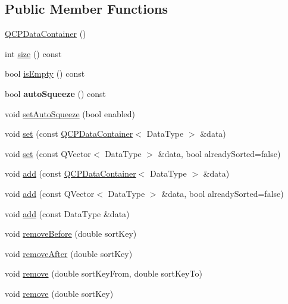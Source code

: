 \subsection*{Public Member Functions}
\begin{DoxyCompactItemize}
\item 
\hyperlink{classQCPDataContainer_af86c0c63719f92c360ff67cc06c6fe6f}{Q\+C\+P\+Data\+Container} ()
\item 
int \hyperlink{classQCPDataContainer_a8e9b262c739672e13472d0d45b720258}{size} () const
\item 
bool \hyperlink{classQCPDataContainer_a7bdebfccd2f9f84bf032882f9d6b00a8}{is\+Empty} () const
\item 
\mbox{\label{classQCPDataContainer_a64f0f1621ca46de2352eaf87476db9b1}} 
bool {\bfseries auto\+Squeeze} () const
\item 
void \hyperlink{classQCPDataContainer_a233f866760a78950d2a393c1a4bc54b5}{set\+Auto\+Squeeze} (bool enabled)
\item 
void \hyperlink{classQCPDataContainer_ae7042bd534fc3ce7befa2ce3f790b5bf}{set} (const \hyperlink{classQCPDataContainer}{Q\+C\+P\+Data\+Container}$<$ Data\+Type $>$ \&data)
\item 
void \hyperlink{classQCPDataContainer_aff99fffbb26597a354c4bc8312596ab2}{set} (const Q\+Vector$<$ Data\+Type $>$ \&data, bool already\+Sorted=false)
\item 
void \hyperlink{classQCPDataContainer_a42b98bd994307ccd163a43d576f91ad9}{add} (const \hyperlink{classQCPDataContainer}{Q\+C\+P\+Data\+Container}$<$ Data\+Type $>$ \&data)
\item 
void \hyperlink{classQCPDataContainer_a51d2a4c9ce4baf5e950b767d26673972}{add} (const Q\+Vector$<$ Data\+Type $>$ \&data, bool already\+Sorted=false)
\item 
void \hyperlink{classQCPDataContainer_a715e8e9972466804954a2f8fbd5288b7}{add} (const Data\+Type \&data)
\item 
void \hyperlink{classQCPDataContainer_aa7f74cbce304b0369e1626c3798e1eda}{remove\+Before} (double sort\+Key)
\item 
void \hyperlink{classQCPDataContainer_abbe5d87ffc10b5aeffa5bb42cf03aa3c}{remove\+After} (double sort\+Key)
\item 
void \hyperlink{classQCPDataContainer_ae5f569a120648b167efa78835f12fd38}{remove} (double sort\+Key\+From, double sort\+Key\+To)
\item 
void \hyperlink{classQCPDataContainer_a2dbded7f0732bacf9db48fdfbbb620bc}{remove} (double sort\+Key)

\end{DoxyCompactItemize}
